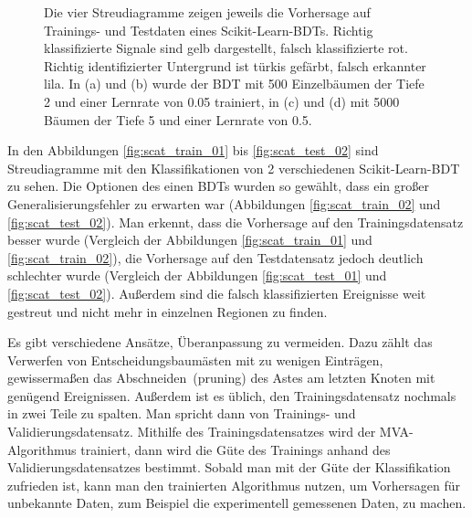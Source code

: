 \begin{figure}[tbp]
\centering     %
{}
\parbox[b]{12cm}{
\caption{Die vier Streudiagramme zeigen jeweils die Vorhersage auf Trainings- und Testdaten eines Scikit-Learn-BDTs. Richtig klassifizierte Signale sind gelb dargestellt, falsch klassifizierte rot. Richtig identifizierter Untergrund ist t\"urkis gef\"arbt, falsch erkannter lila. In (a) und (b) wurde der BDT mit \num{500} Einzelb\"aumen der Tiefe \num{2} und einer Lernrate von \num{0,05} trainiert, in (c) und (d) mit \num{5000} B\"aumen der Tiefe \num{5} und einer Lernrate von \num{0,5}.}
}
\label{fig:boosting}
\end{figure}

In den Abbildungen \ref{fig:scat_train_01} bis \ref{fig:scat_test_02} sind Streudiagramme mit den Klassifikationen von 2 verschiedenen Scikit-Learn-BDT zu sehen. Die Optionen des einen BDTs wurden so gew\"ahlt, dass ein gro\ss er Generalisierungsfehler zu erwarten war (Abbildungen \ref{fig:scat_train_02} und \ref{fig:scat_test_02}). Man erkennt, dass die Vorhersage auf den Trainingsdatensatz besser wurde (Vergleich der Abbildungen \ref{fig:scat_train_01} und \ref{fig:scat_train_02}), die Vorhersage auf den Testdatensatz jedoch deutlich schlechter wurde (Vergleich der Abbildungen \ref{fig:scat_test_01} und \ref{fig:scat_test_02}). Au\ss erdem sind die falsch klassifizierten Ereignisse weit gestreut und nicht mehr in einzelnen Regionen zu finden.

Es gibt verschiedene Ans\"atze, \"Uberanpassung zu vermeiden. Dazu z\"ahlt das Verwerfen von Entscheidungsbaum\"asten mit zu wenigen Eintr\"agen, gewisserma\ss en das \glqq Abschneiden\grqq~(pruning) des Astes am letzten Knoten mit gen\"ugend Ereignissen. Au\ss erdem ist es \"ublich, den Trainingsdatensatz nochmals in zwei Teile zu spalten. Man spricht dann von Trainings- und Validierungsdatensatz. Mithilfe des Trainingsdatensatzes wird der MVA-Algorithmus trainiert, dann wird die G\"ute des Trainings anhand des Validierungsdatensatzes bestimmt. Sobald man mit der G\"ute der Klassifikation zufrieden ist, kann man den trainierten Algorithmus nutzen, um Vorhersagen f\"ur unbekannte Daten, zum Beispiel die experimentell gemessenen Daten, zu machen.

